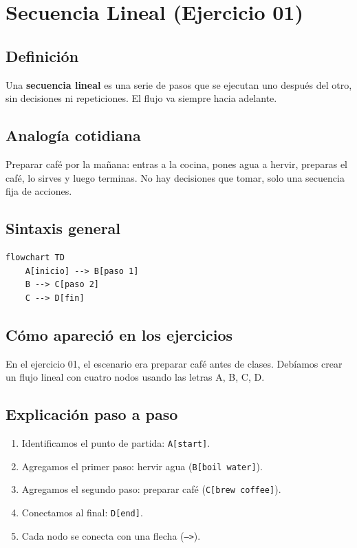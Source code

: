 \documentclass[12pt]{article}
\begin{document}
\newpage

\section{Secuencia Lineal (Ejercicio 01)}

\subsection{Definición}

Una \textbf{secuencia lineal} es una serie de pasos que se ejecutan uno después del otro, sin decisiones ni repeticiones. El flujo va siempre hacia adelante.

\subsection{Analogía cotidiana}

Preparar café por la mañana: entras a la cocina, pones agua a hervir, preparas el café, lo sirves y luego terminas. No hay decisiones que tomar, solo una secuencia fija de acciones.

\subsection{Sintaxis general}

\begin{lstlisting}[style=mermaidstyle]
flowchart TD
    A[inicio] --> B[paso 1]
    B --> C[paso 2]
    C --> D[fin]
\end{lstlisting}

\subsection{Cómo apareció en los ejercicios}

En el ejercicio 01, el escenario era preparar café antes de clases. Debíamos crear un flujo lineal con cuatro nodos usando las letras A, B, C, D.

\subsection{Explicación paso a paso}

\begin{enumerate}
    \item Identificamos el punto de partida: \texttt{A[start]}.
    \item Agregamos el primer paso: hervir agua (\texttt{B[boil water]}).
    \item Agregamos el segundo paso: preparar café (\texttt{C[brew coffee]}).
    \item Conectamos al final: \texttt{D[end]}.
    \item Cada nodo se conecta con una flecha (\texttt{-->}).
\end{enumerate}
\end{document}
